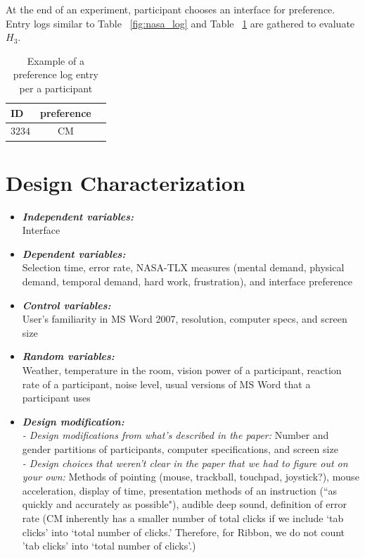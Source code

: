 \documentclass{article}
\begin{document}
At the end of an experiment, participant chooses an interface for preference. Entry logs similar to Table ~\ref{fig:nasa_log} and Table ~\ref{fig:pref_log} are gathered to evaluate $H_3$.   
\begin{table}[tbh]
  \centering
\begin{tabular}{|l|c|c|}
  \hline
    ID               & preference                \\\hline
 $3234$ &   CM      \\ \hline
\end{tabular}
\caption{Example of a  preference log entry per a participant}
\label{fig:pref_log}
\end{table}


\section*{Design Characterization}  
\begin{itemize}
   \item \textbf{\textit{Independent variables:}} \\
   Interface 
    \item \textbf{\textit{Dependent variables:}}\\
    Selection time, error rate, NASA-TLX measures (mental demand, physical demand, temporal demand, hard work, frustration), and interface preference 
    \item \textbf{\textit{Control variables:}} \\
   User's familiarity in MS Word 2007, resolution, computer specs, and screen size
   \item \textbf{\textit{Random variables:}} \\
   Weather, temperature in the room, vision power of a participant, reaction rate of a participant, noise level, usual versions of MS Word that a participant uses
   \item \textbf{\textit{Design modification:}} \\
   \textit{- Design modifications from what's described in the paper:}
   Number and gender partitions of participants, computer specifications, and screen size
   \\
   \textit{- Design choices that weren't clear in the paper that we had to figure out on your own:}
   Methods of pointing (mouse, trackball, touchpad, joystick?), mouse acceleration, display of time, presentation methods of an instruction (``as quickly and accurately as possible"), audible deep sound, definition of error rate (CM inherently has a smaller number of total clicks if we include `tab clicks' into `total number of clicks.' Therefore, for Ribbon, we do not count 'tab clicks' into `total number of clicks'.) 
   \end{itemize}
\end{document}
